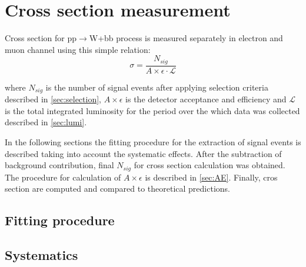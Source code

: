 
\chapter{Cross section measurement} %

\label{Chapter7} %



Cross section for pp$\rightarrow$W+bb process is measured separately in electron and muon channel using this simple relation:
\begin{equation}
\sigma = \frac{N_{sig}}{A\times \epsilon \cdot \mathcal{L}}
\end{equation}

where $N_{sig}$ is the number of signal events after applying selection criteria described in \ref{sec:selection}, $A\times \epsilon$ is the detector acceptance and efficiency and $\mathcal{L}$ is the total integrated luminosity for the period over the which data was collected described in \ref{sec:lumi}. 
\par In the following sections the fitting procedure for the extraction of signal events is described taking into account the systematic effects. After the subtraction of background contribution, final $N_{sig}$ for cross section calculation was obtained. The procedure for calculation of $A\times \epsilon$ is described in \ref{sec:AE}. Finally, cros section are computed and compared to theoretical predictions. 


\section{Fitting procedure}



\section{Systematics}

